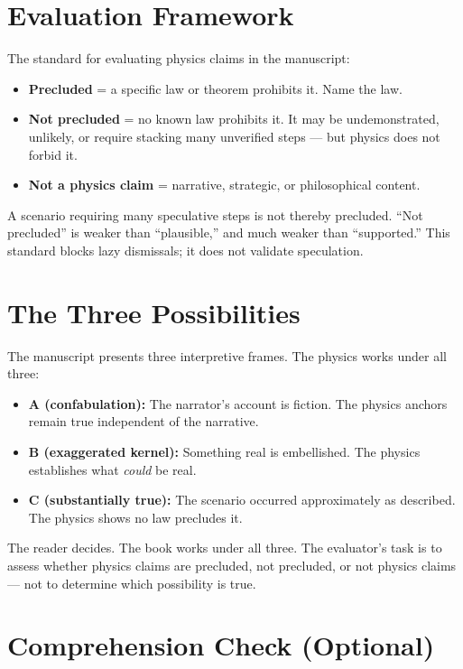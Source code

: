 \section*{Evaluation Framework}

The standard for evaluating physics claims in the manuscript:

\begin{itemize}
\item \textbf{Precluded} = a specific law or theorem prohibits it. Name the law.
\item \textbf{Not precluded} = no known law prohibits it. It may be undemonstrated, unlikely, or require stacking many unverified steps --- but physics does not forbid it.
\item \textbf{Not a physics claim} = narrative, strategic, or philosophical content.
\end{itemize}

A scenario requiring many speculative steps is not thereby precluded. ``Not precluded'' is weaker than ``plausible,'' and much weaker than ``supported.'' This standard blocks lazy dismissals; it does not validate speculation.

\section*{The Three Possibilities}

The manuscript presents three interpretive frames. The physics works under all three:

\begin{itemize}
\item \textbf{A (confabulation):} The narrator's account is fiction. The physics anchors remain true independent of the narrative.
\item \textbf{B (exaggerated kernel):} Something real is embellished. The physics establishes what \textit{could} be real.
\item \textbf{C (substantially true):} The scenario occurred approximately as described. The physics shows no law precludes it.
\end{itemize}

The reader decides. The book works under all three. The evaluator's task is to assess whether physics claims are precluded, not precluded, or not physics claims --- not to determine which possibility is true.

\section*{Comprehension Check (Optional)}

